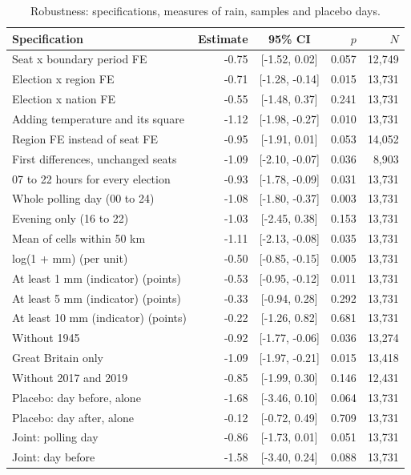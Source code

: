 \documentclass[11pt,a4paper]{article}
\begin{document}
\begin{table}[tbp]\centering\small\caption{Robustness: specifications, measures of rain, samples and placebo days.}\label{tab:rob}
\begin{tabular}{p{7.6cm}rcrr}\toprule Specification & Estimate & 95\% CI & $p$ & $N$\\\midrule
Seat x boundary period FE & -0.75 & [-1.52, 0.02] & 0.057 & 12,749\\
Election x region FE & -0.71 & [-1.28, -0.14] & 0.015 & 13,731\\
Election x nation FE & -0.55 & [-1.48, 0.37] & 0.241 & 13,731\\
Adding temperature and its square & -1.12 & [-1.98, -0.27] & 0.010 & 13,731\\
Region FE instead of seat FE & -0.95 & [-1.91, 0.01] & 0.053 & 14,052\\
First differences, unchanged seats & -1.09 & [-2.10, -0.07] & 0.036 & 8,903\\
\midrule
07 to 22 hours for every election & -0.93 & [-1.78, -0.09] & 0.031 & 13,731\\
Whole polling day (00 to 24) & -1.08 & [-1.80, -0.37] & 0.003 & 13,731\\
Evening only (16 to 22) & -1.03 & [-2.45, 0.38] & 0.153 & 13,731\\
Mean of cells within 50 km & -1.11 & [-2.13, -0.08] & 0.035 & 13,731\\
log(1 + mm) (per unit) & -0.50 & [-0.85, -0.15] & 0.005 & 13,731\\
At least 1 mm (indicator) (points) & -0.53 & [-0.95, -0.12] & 0.011 & 13,731\\
At least 5 mm (indicator) (points) & -0.33 & [-0.94, 0.28] & 0.292 & 13,731\\
At least 10 mm (indicator) (points) & -0.22 & [-1.26, 0.82] & 0.681 & 13,731\\
\midrule
Without 1945 & -0.92 & [-1.77, -0.06] & 0.036 & 13,274\\
Great Britain only & -1.09 & [-1.97, -0.21] & 0.015 & 13,418\\
Without 2017 and 2019 & -0.85 & [-1.99, 0.30] & 0.146 & 12,431\\
\midrule
Placebo: day before, alone & -1.68 & [-3.46, 0.10] & 0.064 & 13,731\\
Placebo: day after, alone & -0.12 & [-0.72, 0.49] & 0.709 & 13,731\\
Joint: polling day & -0.86 & [-1.73, 0.01] & 0.051 & 13,731\\
Joint: day before & -1.58 & [-3.40, 0.24] & 0.088 & 13,731\\

\end{tabular}
\end{table}
\end{document}
